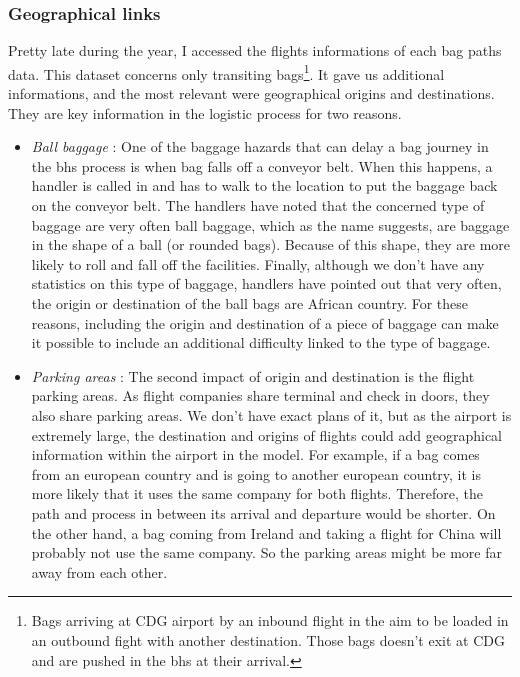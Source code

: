 \documentclass[12pt]{article}
\begin{document}
\newpage
\subsubsection{Geographical links}

Pretty late during the year, I accessed the flights informations of each bag paths data. This dataset concerns only transiting bags\footnote{Bags arriving at CDG airport by an inbound flight in the aim to be loaded in an outbound fight with another destination. Those bags doesn't exit at CDG and are pushed in the \acrshort{bhs} at their arrival.}. It gave us additional informations, and the most relevant were geographical origins and destinations. They are key information in the logistic process for two reasons. 
\begin{itemize}
    \item \textit{Ball baggage} : One of the baggage hazards that can delay a bag journey in the \acrshort{bhs} process is when bag falls off a conveyor belt. When this happens, a handler is called in and has to walk to the location to put the baggage back on the conveyor belt. The handlers have noted that the concerned type of baggage are very often ball baggage, which as the name suggests, are baggage in the shape of a ball (or rounded bags). Because of this shape, they are more likely to roll and fall off the facilities. Finally, although we don't have any statistics on this type of baggage, handlers have pointed out that very often, the origin or destination of the ball bags are African country. For these reasons, including the origin and destination of a piece of baggage can make it possible to include an additional difficulty linked to the type of baggage.


    \item \textit{Parking areas} : The second impact of origin and destination is the flight parking areas. As flight companies share terminal and check in doors, they also share parking areas. We don't have exact plans of it, but as the airport is extremely large, the destination and origins of flights could add geographical information within the airport in the model. For example, if a bag comes from an european country and is going to another european country, it is more likely that it uses the same company for both flights. Therefore, the path and process in between its arrival and departure would be shorter. On the other hand, a bag coming from Ireland and taking a flight for China will probably not use the same company. So the parking areas might be more far away from each other.

\end{itemize}
\end{document}
